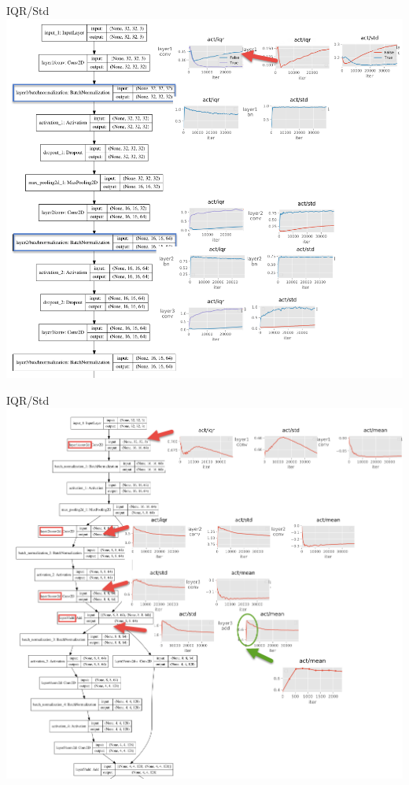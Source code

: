 \documentclass[notes]{beamer}
\begin{document}
\begin{frame}{IQR/Std}
\includegraphics[width=\textwidth]{vgg_bn.png}
\end{frame}
\begin{frame}{IQR/Std}
\includegraphics[width=\textwidth]{resnet_bn.png}
\end{frame}
\end{document}
